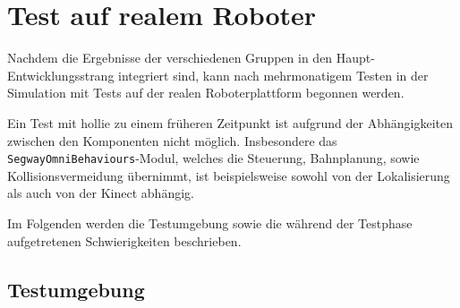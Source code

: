 
\chapter{Test auf realem Roboter}
\authorsection{\editortobias}



Nachdem die Ergebnisse der verschiedenen Gruppen in den Haupt-Entwicklungsstrang integriert sind, kann nach mehrmonatigem Testen in der Simulation mit Tests auf der realen Roboterplattform begonnen werden.

Ein Test mit \gls{hollie} zu einem früheren Zeitpunkt ist aufgrund der Abhängigkeiten zwischen den Komponenten nicht möglich.
Insbesondere das \lstinline{SegwayOmniBehaviours}-Modul, welches die Steuerung, Bahnplanung, sowie Kollisionsvermeidung übernimmt, ist beispielsweise sowohl von der Lokalisierung als auch von der Kinect abhängig.

Im Folgenden werden die Testumgebung sowie die während der Testphase aufgetretenen Schwierigkeiten beschrieben.


\section{Testumgebung}


